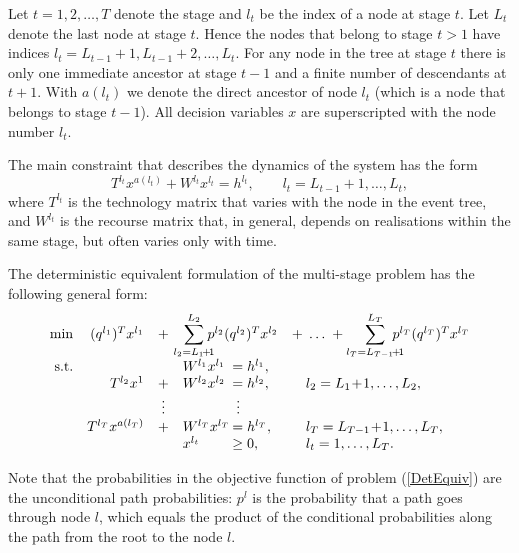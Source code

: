 Let $t = 1,2,\ldots,T$ denote the stage and $l_t$ be the index of a 
node at stage $t$.
Let $L_t$ denote the last node at stage $t$. Hence 
the nodes that belong to stage $t > 1$ have indices 
$l_t = L_{t-1} \! + \! 1, L_{t-1} \! + \! 2, \dots, L_t$. 
For any node in the tree at stage $t$ there is only one immediate
ancestor at stage $t-1$ and a finite number of descendants at $t+1$.
With $a(l_t)$ we denote the direct ancestor of node $l_t$ (which is a 
node that belongs to stage $t-1$).
All decision variables $x$ are superscripted with the node number 
$l_t$.

The main constraint that describes the dynamics of the system has the form 
\[
  T^{l_t}x^{a(l_t)} +W^{l_t}x^{l_t} =h^{l_t}, \qquad l_t =L_{t-1}+1,\dots,L_t,
\]
%
where $T^{l_t}$ is the technology matrix that varies 
with the node in the event tree, and $W^{l_t}$ is the recourse
matrix that, in general, depends on realisations within the same stage,
but often varies only with time.

The deterministic equivalent formulation of the multi-stage 
problem has the following general form:
\begin{equation}
  \begin{array}{rrclll}
    \min & (q^{l_1})^T x^{l_1} & + & \!\!\!\!{\displaystyle \sum_{l_2=L_1 \!+\! 1}^{L_2}} \!\!\! p^{l_2} (q^{l_2})^T x^{l_2} && \!\!\!\!\!\!  + \; \ldots \; + {\displaystyle \sum_{l_T = L_{T-1} \! + \! 1}^{L_T}} \!\!\!\!\! p^{l_T} (q^{l_T})^T x^{l_T} \\
    \mbox{s.t.} & & & W^{l_1} x^{l_1} & \hspace{-1.5cm} = h^{l_1}, \\
    & T^{l_2} x^1 & + & W^{l_2} x^{l_2} & \hspace{-1.5cm} = h^{l_2}, & l_2 = L_1 \!+\! 1,\dots,L_2, \\
    & & \vdots & & \hspace{-1.4cm} \vdots \\
    & T^{l_T} x^{a(l_T)} & + &  W^{l_T} x^{l_T} & \hspace{-1.5cm} = h^{l_T}, & l_T = L_{T-1} \! + \! 1, \dots, L_T, \\
    & & & x^{l_t} & \hspace{-1.5cm} \geq 0, & l_t = 1,\dots, L_{T}. \\
    \label{DetEquiv}
  \end{array} 
\end{equation}

Note that the probabilities in the objective function of problem 
(\ref{DetEquiv}) are the unconditional path probabilities: $p^l$ is 
the probability that a path goes through node $l$, which equals the 
product of the conditional probabilities along the path from the root 
to the node $l$.

